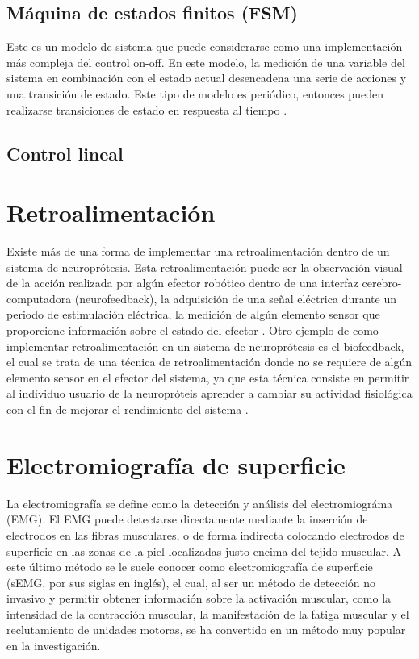 \subsection{Máquina de estados finitos (FSM)}
Este es un modelo de sistema que puede considerarse como una implementación más compleja del control on-off. En este modelo, la medición de una variable del sistema en combinación con el estado actual desencadena una serie de acciones y una transición de estado. Este tipo de modelo es periódico, entonces pueden realizarse transiciones de estado en respuesta al tiempo \cite{Wright2016}.

{\color{red}\subsection{Control lineal}}



\section{Retroalimentación}
Existe más de una forma de implementar una retroalimentación dentro de un sistema de neuroprótesis. Esta retroalimentación puede ser la observación visual de la acción realizada por algún efector robótico dentro de una interfaz cerebro-computadora (neurofeedback), la adquisición de una señal eléctrica durante un periodo de estimulación eléctrica, la medición de algún elemento sensor que proporcione información sobre el estado del efector \cite{Wright2016}. Otro ejemplo de como implementar retroalimentación en un sistema de neuroprótesis es el biofeedback, el cual se trata de una técnica de retroalimentación donde no se requiere de algún elemento sensor en el efector del sistema, ya que esta técnica consiste en permitir al individuo usuario de la neuropróteis aprender a cambiar su actividad fisiológica con el fin de mejorar el rendimiento del sistema \cite{Yucha2008}.

\section{Electromiografía de superficie}
La electromiografía se define como la detección y análisis del electromiográma (EMG). El EMG puede detectarse directamente mediante la inserción de electrodos en las fibras musculares, o de forma indirecta colocando electrodos de superficie en las zonas de la piel localizadas justo encima del tejido muscular. A este último método se le suele conocer como electromiografía de superficie (sEMG, por sus siglas en inglés), el cual, al ser un método de detección no invasivo y permitir obtener información sobre la activación muscular, como la intensidad de la contracción muscular, la manifestación de la fatiga muscular y el reclutamiento de unidades motoras, se ha convertido en un método muy popular en la investigación.


